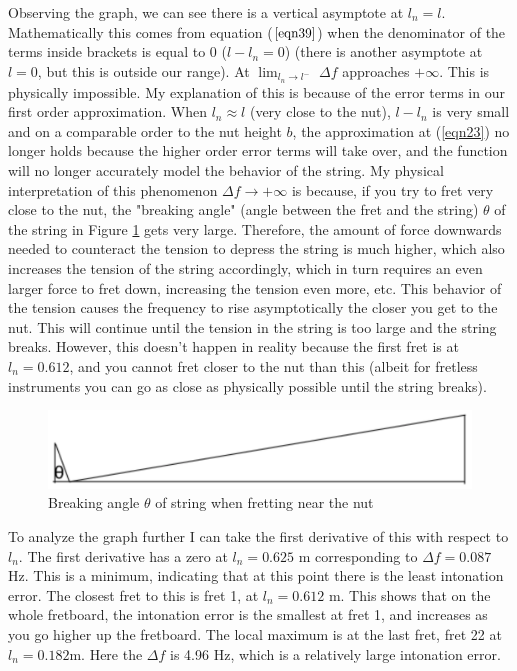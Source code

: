 Observing the graph, we can see there is a vertical asymptote at $l_n = l$. Mathematically this comes from equation ($\ref{eqn39}$) when the denominator of the terms inside brackets is equal to 0 ($l-l_n = 0$) (there is another asymptote at $l=0$, but this is outside our range). At $\lim_{l_n \to l^-}$ $\Delta f$ approaches $+\infty$. This is physically impossible. My explanation of this is because of the error terms in our first order approximation. When $l_n \approx l$ (very close to the nut), $l-l_n$ is very small and on a comparable order to the nut height $b$, the approximation at (\ref{eqn23}) no longer holds because the higher order error terms will take over, and the function will no longer accurately model the behavior of the string. My physical interpretation of this phenomenon $\Delta f \to +\infty $ is because, if you try to fret very close to the nut, the "breaking angle" (angle between the fret and the string) $\theta$ of the string in Figure \ref{fig8} gets very large. Therefore, the amount of force downwards needed to counteract the tension to depress the string is much higher, which also increases the tension of the string accordingly, which in turn requires an even larger force to fret down, increasing the tension even more, etc. This behavior of the tension causes the frequency to rise asymptotically the closer you get to the nut. This will continue until the tension in the string is too large and the string breaks. However, this doesn't happen in reality because the first fret is at $l_n = 0.612$, and you cannot fret closer to the nut than this (albeit for fretless instruments you can go as close as physically possible until the string breaks). \par
\begin{figure}[!htb]
    \includegraphics[width=\textwidth]{./ee/breaking_angles.png}
    \caption{Breaking angle $\theta$ of string when fretting near the nut} \label{fig8}
\end{figure}
To analyze the graph further I can take the first derivative of this with respect to $l_n$. The first derivative has a zero at $l_n = 0.625$ m corresponding to $\Delta f = 0.087$ Hz. This is a minimum, indicating that at this point there is the least intonation error. The closest fret to this is fret 1, at $l_n = 0.612$ m. This shows that on the whole fretboard, the intonation error is the smallest at fret 1, and increases as you go higher up the fretboard. The local maximum is at the last fret, fret 22 at $l_n = 0.182 $m. Here the $\Delta f$ is 4.96 Hz, which is a relatively large intonation error.

